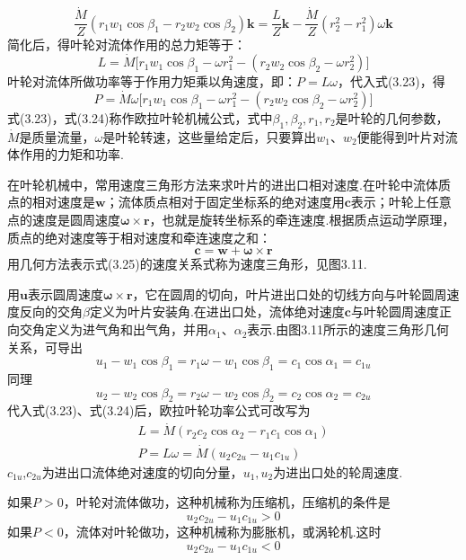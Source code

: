 \[
\frac{\dot{M}}{Z}(r_1w_1\cos\beta_1-r_2w_2\cos\beta_2)\boldsymbol{k}=\frac{L}{Z}\boldsymbol{k}-\frac{\dot{M}}{Z}(r_2^{2}-r_1^{2})\omega\boldsymbol{k}
\]
简化后，得叶轮对流体作用的总力矩等于：
\begin{equation*}
L=\dot{M}\big[r_1w_1\cos\beta_1-\omega r_1^{2}-(r_2w_2\cos\beta_2-\omega r_2^{2})\big]
\tag{3.23}
\end{equation*}
叶轮对流体所做功率等于作用力矩乘以角速度，即：$P=L\omega$，代入式(3.23)，得
\begin{equation*}
P=\dot{M}\omega\big[r_1w_1\cos\beta_1-\omega r_1^{2}-(r_2w_2\cos\beta_2-\omega r_2^{2})\big]
\tag{3.24}
\end{equation*}
式(3.23)，式(3.24)称作欧拉叶轮机械公式，式中$\beta_1,\beta_2,r_1,r_2$是叶轮的几何参数，$\dot{M}$是质量流量，$\omega$是叶轮转速，这些量给定后，只要算出$w_1$、$w_2$便能得到叶片对流体作用的力矩和功率.

在叶轮机械中，常用速度三角形方法来求叶片的进出口相对速度.在叶轮中流体质点的相对速度是$\boldsymbol{w}$；流体质点相对于固定坐标系的绝对速度用$\boldsymbol{c}$表示；叶轮上任意点的速度是圆周速度$\boldsymbol{\omega}\times\boldsymbol{r}$，也就是旋转坐标系的牵连速度.根据质点运动学原理，质点的绝对速度等于相对速度和牵连速度之和：
\begin{equation*}
\boldsymbol{c}=\boldsymbol{w}+\boldsymbol{\omega}\times\boldsymbol{r}
\tag{3.25}
\end{equation*}
用几何方法表示式(3.25)的速度关系式称为速度三角形，见图3.11.

用$\boldsymbol{u}$表示圆周速度$\boldsymbol{\omega}\times\boldsymbol{r}$，它在圆周的切向，叶片进出口处的切线方向与叶轮圆周速度反向的交角$\beta$定义为叶片安装角.在进出口处，流体绝对速度$\boldsymbol{c}$与叶轮圆周速度正向交角定义为进气角和出气角，并用$\alpha_1$、$\alpha_2$表示.由图3.11所示的速度三角形几何关系，可导出
\[
u_1-w_1\cos\beta_1=r_1\omega-w_1\cos\beta_1=c_1\cos\alpha_1=c_{1u}
\]
同理
\[
u_2-w_2\cos\beta_2=r_2\omega-w_2\cos\beta_2=c_2\cos\alpha_2=c_{2u}
\]
代入式(3.23)、式(3.24)后，欧拉叶轮功率公式可改写为
\begin{gather*}
L=\dot{M}(r_2c_2\cos\alpha_2-r_1c_1\cos\alpha_1)\tag{3.26a}\\[2pt]
P=L\omega=\dot{M}(u_2c_{2u}-u_1c_{1u})\tag{3.26b}
\end{gather*}
$c_{1u}$,$c_{2u}$为进出口流体绝对速度的切向分量，$u_1,u_2$为进出口处的轮周速度.

如果$P>0$，叶轮对流体做功，这种机械称为压缩机，压缩机的条件是
\[
u_2c_{2u}-u_1c_{1u}>0
\]
如果$P<0$，流体对叶轮做功，这种机械称为膨胀机，或涡轮机.这时
\[
u_2c_{2u}-u_1c_{1u}<0
\]

